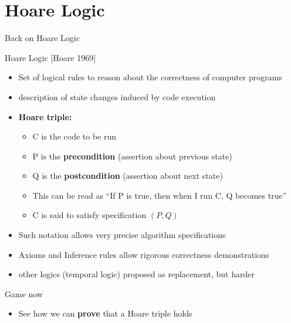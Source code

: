 \section{Hoare Logic}\sectionpage
\begin{frame}{Back on Hoare Logic}
  \begin{block}{Hoare Logic {\normalsize[Hoare 1969]}}
    \begin{itemize}
    \item Set of logical rules to reason about the correctness of computer
      programs
    \item {} description of state changes induced by
      code execution
    \item \alert{\textbf{Hoare triple:}} 
      \begin{itemize}
      \item C is the code to be run
      \item P is the \alert{\textbf{precondition}}
        (assertion about previous state)
      \item Q is the \alert{\textbf{postcondition}}
        (assertion about next state)
      \item This can be read as ``If P is true, then when I run C, Q becomes
        true''
      \item C is said to satisfy specification $(P,Q)$
      \end{itemize}
    \item Such notation allows very precise algorithm specifications
    \item Axioms and Inference rules allow rigorous correctness demonstrations
      \smallskip
    \item {} other logics (temporal logic) proposed as
      replacement, but harder
    \end{itemize}
  \end{block}
  
  \begin{alertblock}{Game now}
    \begin{itemize}
    \item See how we can \textbf{prove} that a Hoare triple holds
    \end{itemize}    
  \end{alertblock}
\end{frame}
